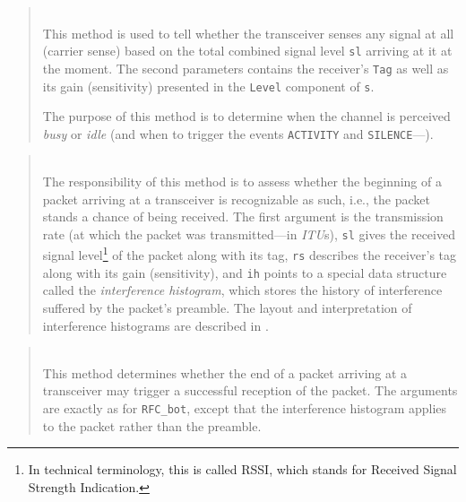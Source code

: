 \begin{quote}
\noindent{} \hspace{0in}\vspace{0.05in}\\
\noindent
This method is used to tell whether the transceiver senses any signal at
all (carrier sense)
based on the total combined signal level {\tt sl} arriving at it at the moment.
The second parameters contains the receiver's {\tt Tag} as well as its
gain (sensitivity) presented in the {\tt Level} component of {\tt s}.

The purpose of this method is to determine when the channel is perceived
{\em busy\/} or {\em idle\/} (and when to trigger the events {\tt ACTIVITY} and
{\tt SILENCE}---).
\end{quote}

\begin{quote}
\noindent{} \hspace{0in}\vspace{0.05in}\\
\noindent
The responsibility of
this method is to assess whether the beginning of a packet arriving at a
transceiver is recognizable as such, i.e., the packet stands a chance of
being received.
The first argument is the transmission rate (at which the packet was
transmitted---in {\em ITU\/}s), {\tt sl} gives the received signal
level\footnote{In technical terminology, this is called RSSI, which
stands for Received Signal Strength Indication.}
of the packet along with its tag,
{\tt rs} describes the receiver's tag along with its gain (sensitivity),
and {\tt ih} points to a special data structure called the {\em interference
histogram}, which stores the history of interference
suffered by the packet's preamble.
The layout and interpretation of interference histograms are described in
.
\end{quote}

\begin{quote}
\noindent{} \hspace{0in}\vspace{0.05in}\\
\noindent
This method determines whether the end of a packet arriving at a transceiver
may trigger a successful reception of the packet.
The arguments are exactly as for {\tt RFC\_bot}, except that the
interference histogram applies to the packet rather than the preamble.
\end{quote}

